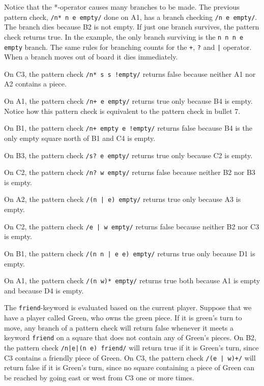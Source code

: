 Notice that the *-operator causes many branches to be made. The previous pattern check, \texttt{/n* n e empty/} done on A1, has a branch checking \texttt{/n e empty/}. The branch dies because B2 is not empty. If just one branch survives, the pattern check returns true. In the example, the only branch surviving is the \texttt{n n n e empty} branch. The same rules for branching counts for the \texttt{+}, \texttt{?} and \texttt{|} operator. When a branch moves out of board it dies immediately.

\begin{nlist}
\item On C3, the pattern check \texttt{/n* s s !empty/} returns false because neither A1 nor A2 contains a piece.
\item On A1, the pattern check \texttt{/n+ e empty/} returns true only because B4 is empty. Notice how this pattern check is equivalent to the pattern check in bullet 7.
\item On B1, the pattern check \texttt{/n+ empty e !empty/} returns false because B4 is the only empty square north of B1 and C4 is empty.
\item On B3, the pattern check \texttt{/s? e empty/} returns true only because C2 is empty. 
\item On C2, the pattern check \texttt{/n? w empty/} returns false because neither B2 nor B3 is empty.
\item On A2, the pattern check \texttt{/(n | e) empty/} returns true only because A3 is empty.
\item On C2, the pattern check \texttt{/e | w empty/} returns false because neither B2 nor C3 is empty.
\item On B1, the pattern check \texttt{/(n n | e e) empty/} returns true only because D1 is empty.
\item On A1, the pattern check \texttt{/(n w)* empty/} returns true both because A1 is empty and because D4 is empty.
\end{nlist}

The \texttt{friend}-keyword is evaluated based on the current player. Suppose that we have a player called Green, who owns the 
green piece. If it is green's turn to move, any branch of a pattern check will return false
whenever it meets a keyword \texttt{friend} on a square that does not contain any of Green's pieces.
On B2, the pattern check \texttt{/n|e|(n e) friend/} will return true if it is Green's turn, since C3 contains a friendly piece of Green.
On C3, the pattern check \texttt{/(e | w)+/} will return false if it is Green's turn, since no square containing a piece of Green can be reached by going east or west from C3 one or more times.

